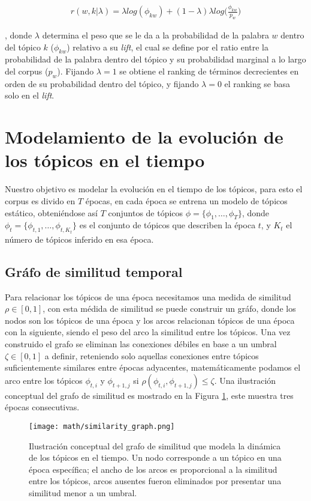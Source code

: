 \documentclass[letterpaper,12pt,oneside]{book} %
\begin{document}
\begin{align}
    r(w,k|\lambda) = \lambda log (\phi_{kw})+ (1-\lambda)\lambda log\bigg(\frac{\phi_{kw}}{p_{w}}\bigg)
\end{align}

, donde $\lambda$ determina el peso que se le da a la probabilidad de la palabra $w$ dentro del tópico $k$ ($\phi_{kw}$) relativo a su \textit{lift}, el cual se define por el ratio entre la probabilidad de la palabra dentro del tópico y su probabilidad marginal a lo largo del corpus ($p_w$). Fijando $\lambda=1$ se obtiene el ranking de términos decrecientes en orden de su probabilidad dentro del tópico, y fijando $\lambda=0$ el ranking se basa solo en el \textit{lift}.

\section{Modelamiento de la evolución de los tópicos en el tiempo}

Nuestro objetivo es modelar la evolución en el tiempo de los tópicos, para esto el corpus es divido en $T$ épocas, en cada época se entrena un modelo de tópicos estático, obteniéndose así $T$ conjuntos de tópicos $\phi=\{\phi_{1}, \ldots, \phi_{T}\}$, donde $\phi_{t}=\{\phi_{t,1}, \ldots, \phi_{t,K_{t}}\}$ es el conjunto de tópicos que describen la época $t$, y $K_{t}$ el número de tópicos inferido en esa época.

\subsection{Gráfo de similitud temporal}
Para relacionar los tópicos de una época necesitamos una medida de similitud $\rho \in [0,1]$, con esta médida de similitud se puede construir un gráfo, donde los nodos son los tópicos de una época y los arcos relacionan tópicos de una época con la siguiente, siendo el peso del arco la similitud entre los tópicos. Una vez construido el grafo se eliminan las conexiones débiles en base a un umbral $\zeta \in [0,1]$ a definir, reteniendo solo aquellas conexiones entre tópicos suficientemente similares entre épocas adyacentes, matemáticamente podamos el arco entre los tópicos $\phi_{t,i}$ y $\phi_{t+1,j}$ si $\rho(\phi_{t,i}, \phi_{t+1,j})\leq \zeta$. Una ilustración conceptual del grafo de similitud es mostrado en la Figura \ref{img:graph}, este muestra tres épocas consecutivas.

\begin{figure}
    \centering
    \texttt{[image: math/similarity\_graph.png]}
    \caption{Ilustración conceptual del grafo de similitud que modela la dinámica de los tópicos en el tiempo. Un nodo corresponde a un tópico en una época específica; el ancho de los arcos es proporcional a la similitud entre los tópicos, arcos ausentes fueron eliminados por presentar una similitud menor a un umbral.}
    \label{img:graph}
\end{figure}
\end{document}

